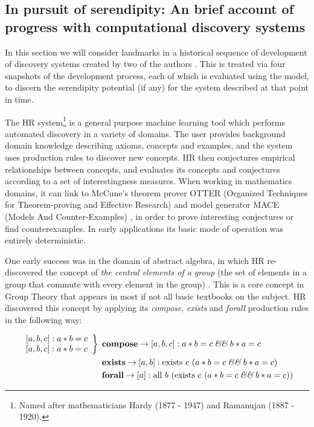 \subsection{In pursuit of serendipity: An brief account of progress with computational discovery systems} \label{sec:pursuit}

In this section we will consider landmarks in a historical sequence of
development of discovery systems created by two of the authors
\cite{colton2002automated,pease07}.  This is treated via four
snapshots of the development process, each of which is evaluated
using the model, to discern the serendipity potential (if any) for
the system described at that point in time.

\begin{ex}\label{ex:central}
The {\sf HR} system\footnote{Named after mathematicians Hardy (1877 - 1947) and Ramanujan (1887 - 1920).} \citet{colton2002automated} is a general purpose machine learning tool which performs automated discovery in a variety of domains. The user provides background domain knowledge describing axioms, concepts and examples, and the system uses production rules to discover new concepts.  HR then conjectures empirical relationships between concepts, and evaluates its concepts and conjectures according to a set of interestingness measures.  When working in mathematics domains, it can link to McCune's theorem prover {\sf OTTER} (Organized Techniques for Theorem-proving and Effective Research)\cite{mccune:90} and model generator {\sf MACE} (Models And Counter-Examples) \cite{mccune:macemanual,zhang}, in order to prove interesting conjectures or find counterexamples.  In early applications its basic mode of operation was entirely deterministic.

One early success was in the domain of abstract algebra, in which {\sf HR} re-discovered the concept of \emph{the central elements of a group} (the set of elements in a group that commute with every element in the group) \cite{colton2002automated}.  This is a core concept in Group Theory that appears in most if not all basic textbooks on the subject.  HR discovered this concept by applying its {\em compose}, {\em exists} and {\em forall} production rules in the following way:  

\begin{align*}
\left.
\begin{array}{c}
{[}a,b,c{]} : a*b=c\\
{[}a,b,c{]} : a*b=c
\end{array}
\right\}\:\:
&\mathbf{compose}\rightarrow [a,b,c] : a*b=c \:\text{\emph{\&\&}}\: b*a=c\\
&\mathbf{exists}\rightarrow [a,b] : \text{exists}\ c\ (a*b=c \:\text{\emph{\&\&}}\: b*a=c)\\
&\mathbf{forall}\rightarrow [a] : \text{all}\ b\ (\text{exists}\ c\ (a*b=c \:\text{\emph{\&\&}}\: b*a=c))
\end{align*}
\end{ex}

